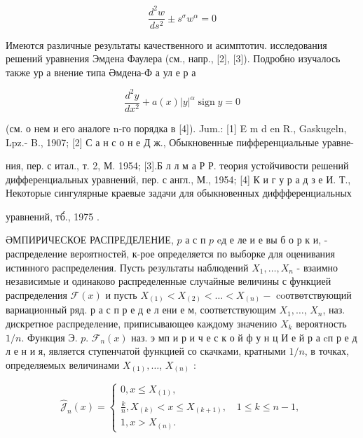 \documentclass[10pt]{article}
\begin{document}
\[

\frac{d^{2} w}{d s^{2}} \pm s^{\sigma} w^{\alpha}=0

\]



Имеются различные результаты качественного и асимптотич. исследования решений уравнения Эмдена Фаулера (см., напр., [2], [3]). Подробно изучалось также ур а внение типа Әмдена-Ф а ул е р а



\[

\frac{d^{2} y}{d x^{2}}+a(x)|y|^{\alpha} \operatorname{sign} y=0

\]



(см. о нем и его аналоге n-го порядка в [4]). Jum.: [1] E m d en R., Gaskugeln, Lpz.- B., 1907; [2] С а н с о н е Д ж., Обыкновенные пифференциальные уравне-

ния, пер. с итал., т. 2, М. 1954; [3].Б л л м а Р Р. теория устойчивости решений дифференциальных уравнений, пер. с англ., М., 1954; [4] К и г у р а д з е И. Т., Некоторые сингулярные краевые задачи для обыкновенных диффференциальных



уравнений, тб́., 1975 .



ӘМПИРИЧЕСКОЕ РАСПРЕДЕЛЕНИЕ, $p$ а с п $p$ eд е ле и е вы б о р к и, - распределение вероятностей, к-рое определяется по выборке для оценивания истинного распределения. Пусть результаты наблюдений $X_{1}, \ldots, X_{n}$ - взаимно независимые и одинаково распределенные случайные величины с функцией распределения $\mathscr{F}(x)$ и пусть $X_{(1)}<X_{(2)}<\ldots<X_{(n)}-$ coотвөтствующий вариационный ряд. р а с п р е д е л ени е м, соответствующим $X_{1}, \ldots$, $X_{n}$, наз. дискретное распределение, приписывающеө каждому значению $X_{k}$ вероятность $1 / n$. Функция Э. $p$. $\mathscr{F}_{n}(x)$ наз. э мп и р и ч е с к о й ф у н ц И е й р а cп р е д л е н и я, является ступенчатой функцией со скачками, кратными $1 / n$, в точках, определяемых величинами $X_{(1)}, \ldots$, $X_{(n)}$ :



\[

\hat{\mathscr{J}}_{n}(x)=\left\{\begin{array}{l}

0, x \leqslant X_{(1)}, \\

\frac{k}{n}, X_{(k)}<x \leqslant X_{(k+1)}, \quad 1 \leqslant k \leqslant n-1, \\

1, x>X_{(n)} .

\end{array}\right.

\]
\end{document}
